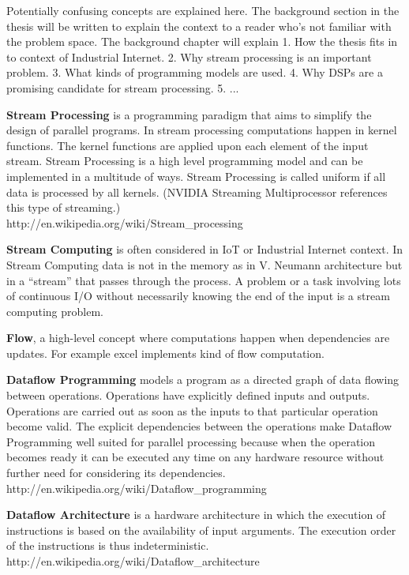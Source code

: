 Potentially confusing concepts are explained here. The background section in the thesis will be written to explain the context to a reader who's not familiar with the problem space. The background chapter will explain 1. How the thesis fits in to context of Industrial Internet. 2. Why stream processing is an important problem. 3. What kinds of programming models are used. 4. Why DSPs are a promising candidate for stream processing. 5. ... 

\textbf{Stream Processing} is a programming paradigm that aims to simplify the design of parallel programs. In stream processing computations happen in kernel functions. The kernel functions are applied upon each element of the input stream. Stream Processing is a high level programming model and can be implemented in a multitude of ways. Stream Processing is called uniform if all data is processed by all kernels. (NVIDIA Streaming Multiprocessor references this type of streaming.) \\http://en.wikipedia.org/wiki/Stream\_processing

\textbf{Stream Computing} is often considered in IoT or Industrial Internet context. In Stream Computing data is not in the memory as in V. Neumann architecture but in a ``stream'' that passes through the process. A problem or a task involving lots of continuous I/O without necessarily knowing the end of the input is a stream computing problem.

\textbf{Flow}, a high-level concept where computations happen when dependencies are updates. For example excel implements kind of flow computation.

\textbf{Dataflow Programming} models a program as a directed graph of data flowing between operations. Operations have explicitly defined inputs and outputs. Operations are carried out as soon as the inputs to that particular operation become valid. The explicit dependencies between the operations make Dataflow Programming well suited for parallel processing because when the operation becomes ready it can be executed any time on any hardware resource without further need for considering its dependencies.\\http://en.wikipedia.org/wiki/Dataflow\_programming

\textbf{Dataflow Architecture} is a hardware architecture in which the execution of instructions is based on the availability of input arguments. The execution order of the instructions is thus indeterministic.\\http://en.wikipedia.org/wiki/Dataflow\_architecture

